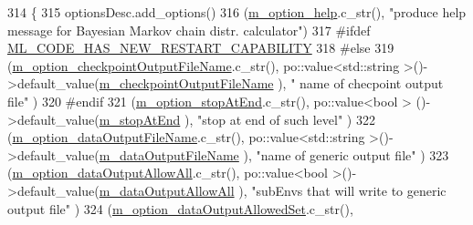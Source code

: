 \begin{DoxyCode}
314 \{
315   optionsDesc.add\_options()     
316     (\hyperlink{class_q_u_e_s_o_1_1_m_l_sampling_level_options_a5f29394c92a49c24e9c2725320ee3406}{m\_option\_help}.c\_str(),                                                                   
                                                                 \textcolor{stringliteral}{"produce help message for Bayesian Markov chain
       distr. calculator"})
317 #ifdef \hyperlink{_defines_8h_aad80372764e15a7ed434e7ad41ac27b2}{ML\_CODE\_HAS\_NEW\_RESTART\_CAPABILITY}
318 #\textcolor{keywordflow}{else}
319     (\hyperlink{class_q_u_e_s_o_1_1_m_l_sampling_level_options_ab0b21922a976c557cdcded05fcbb9a54}{m\_option\_checkpointOutputFileName}.c\_str(),                   
      po::value<std::string >()->default\_value(\hyperlink{class_q_u_e_s_o_1_1_m_l_sampling_level_options_aa53156a239401da4600af25921bac260}{m\_checkpointOutputFileName}                 ), \textcolor{stringliteral}{"
      name of checpoint output file"}                                   )
320 #endif
321     (\hyperlink{class_q_u_e_s_o_1_1_m_l_sampling_level_options_a3182deb5fada9f8cc55f6335c5a65f46}{m\_option\_stopAtEnd}.c\_str(),                                  po::value<bool        >
      ()->default\_value(\hyperlink{class_q_u_e_s_o_1_1_m_l_sampling_level_options_adbdb0fa054244261b7beb2cead72ef06}{m\_stopAtEnd}                                ), \textcolor{stringliteral}{"stop at end of such level"}      
                                       )
322     (\hyperlink{class_q_u_e_s_o_1_1_m_l_sampling_level_options_a16d8f61e3c8cf7281a8ad20af005f0c3}{m\_option\_dataOutputFileName}.c\_str(),                         
      po::value<std::string >()->default\_value(\hyperlink{class_q_u_e_s_o_1_1_m_l_sampling_level_options_a56871c5760820c93526948a6e1c024e5}{m\_dataOutputFileName}                       ), \textcolor{stringliteral}{"name of
       generic output file"}                                     )
323     (\hyperlink{class_q_u_e_s_o_1_1_m_l_sampling_level_options_a27d13c15a4e8fbb4c748a3dc127feca8}{m\_option\_dataOutputAllowAll}.c\_str(),                         po::value<bool
              >()->default\_value(\hyperlink{class_q_u_e_s_o_1_1_m_l_sampling_level_options_ad6a290719785a151c5876bb04145442a}{m\_dataOutputAllowAll}                       ), \textcolor{stringliteral}{"subEnvs that
       will write to generic output file"}                  )
324     (\hyperlink{class_q_u_e_s_o_1_1_m_l_sampling_level_options_a9c4ef337e2c0c01cb6c8cbaa9a985f84}{m\_option\_dataOutputAllowedSet}.c\_str(),                       

\end{DoxyCode}

